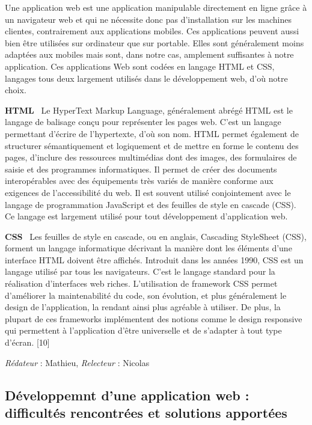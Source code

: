\documentclass[oneside,a4paper,13pt]{article}
\begin{document}
Une application web est une application manipulable directement en ligne grâce à un navigateur web et qui ne nécessite donc pas d'installation sur les machines clientes, contrairement aux applications mobiles. Ces applications peuvent aussi bien être utilisées sur ordinateur que sur portable. Elles sont généralement moins adaptées aux mobiles mais sont, dans notre cas, amplement suffisantes à notre application. Ces applications Web sont codées en langage HTML et CSS, langages tous deux largement utilisés dans le développement web, d’où notre choix. 

\bigbreak
\textbf{HTML}
\newline
\
Le HyperText Markup Language, généralement abrégé HTML est le langage de balisage conçu pour représenter les pages web. C’est un langage permettant d’écrire de l’hypertexte, d’où son nom. HTML permet également de structurer sémantiquement et logiquement et de mettre en forme le contenu des pages, d’inclure des ressources multimédias dont des images, des formulaires de saisie et des programmes informatiques. Il permet de créer des documents interopérables avec des équipements très variés de manière conforme aux exigences de l’accessibilité du web. Il est souvent utilisé conjointement avec le langage de programmation JavaScript et des feuilles de style en cascade (CSS). Ce langage est largement utilisé pour tout développement d’application web. 

\smallbreak
\textbf{CSS}
\newline
\
Les feuilles de style en cascade, ou en anglais, Cascading StyleSheet (CSS), forment un langage informatique décrivant la manière dont les éléments d’une interface HTML doivent être affichés. Introduit dans les années 1990, CSS est un langage utilisé par tous les navigateurs. C’est le langage standard pour la réalisation d’interfaces web riches. L’utilisation de framework CSS permet d’améliorer la maintenabilité du code, son évolution, et plus généralement le design de l’application, la rendant ainsi plus agréable à utiliser. De plus, la plupart de ces frameworks implémentent des notions comme le design responsive qui permettent à l’application d’être universelle et de s’adapter à tout type d’écran. [10]

\smallbreak\textit{Rédateur} : Mathieu, \textit{Relecteur} : Nicolas


\subsection{Développemnt d'une application web : difficultés rencontrées et solutions apportées}
\end{document}
